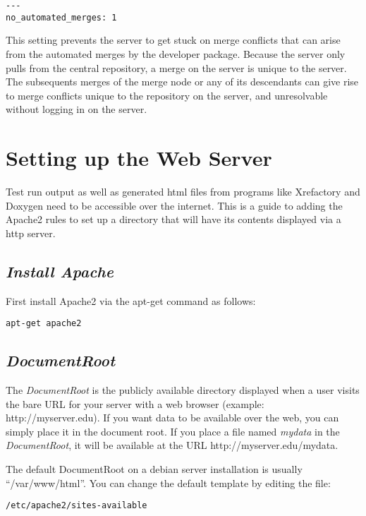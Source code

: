 \documentclass[12pt]{article}
\begin{document}
\begin{verbatim}
---
no_automated_merges: 1
\end{verbatim}

This setting prevents the server to get stuck on merge conflicts that
can arise from the automated merges by the developer package.  Because
the server only pulls from the central repository, a merge on the
server is unique to the server.  The subsequents merges of the merge
node or any of its descendants can give rise to merge conflicts unique
to the repository on the server, and unresolvable without logging in
on the server.


\section*{Setting up the Web Server}

Test run output as well as generated html files from programs like Xrefactory and Doxygen need to be accessible over the internet. This is a guide to adding the Apache2 rules to set up a directory that will have its contents displayed via a http server.

\subsection*{\it Install Apache}

First install Apache2 via the apt-get command as follows:

\begin{verbatim}
apt-get apache2
\end{verbatim}

\subsection*{\it DocumentRoot}

The {\it DocumentRoot} is the publicly available directory displayed when a user visits the bare URL for your server with a web browser (example: http://myserver.edu). If you want data to be available over the web, you can simply place it in the document root. If you place a file named {\it mydata} in the {\it DocumentRoot}, it will be available at the URL http://myserver.edu/mydata.

The default DocumentRoot on a debian server installation is usually ``/var/www/html''. You can change the default template by editing the file:

\begin{verbatim}
/etc/apache2/sites-available
\end{verbatim}
\end{document}
